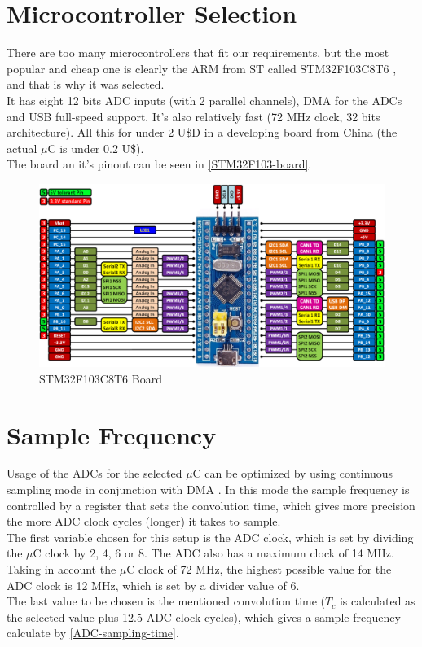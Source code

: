 \section{Microcontroller Selection}
There are too many microcontrollers that fit our requirements, but the most popular
and cheap one is clearly the ARM from ST called STM32F103C8T6 \cite{STM32F103},
and that is why it was selected. \\
It has eight 12 bits ADC inputs (with 2 parallel channels), DMA for the ADCs and USB full-speed support. It's
also relatively fast (72 MHz clock, 32 bits architecture). All this for under 2 U\$D
in a developing board from China (the actual $\mu$C is under 0.2 U\$). \\
The board an it's pinout can be seen in \autoref{STM32F103-board}.

\begin{figure}[htb]
  \centering
  \caption{STM32F103C8T6 Board}
  \label{STM32F103-board}
  \includegraphics[scale=0.3]{images/STM32F103-board.png}
\end{figure}

\section{Sample Frequency}
\label{firmware-sample-frequency}
Usage of the ADCs for the selected $\mu$C can be optimized by using continuous sampling
mode in conjunction with DMA \cite[ch. 11]{STM32F103}. In this mode the sample frequency is controlled by a register
that sets the convolution time, which gives more precision the more ADC clock
cycles (longer) it takes to sample.\\
The first variable chosen for this setup is the ADC clock, which is set by dividing
the $\mu$C clock by 2, 4, 6 or 8. The ADC also has a maximum clock of 14 MHz. Taking in
account the  $\mu$C clock of 72 MHz, the highest possible value for the ADC clock is 12 MHz,
which is set by a divider value of 6. \\
The last value to be chosen is the mentioned convolution time ($T_{c}$ is calculated as the selected
value plus 12.5 ADC clock cycles), which gives a sample frequency calculate by \autoref{ADC-sampling-time}.

